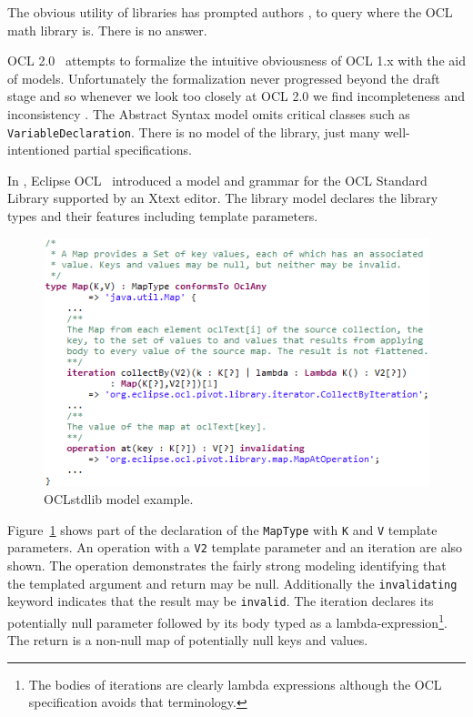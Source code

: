 \documentclass[sigconf]{acmart}
\begin{document}
The obvious utility of libraries has prompted authors \cite{Baar2011},\cite{Cabot2012} to query where the OCL math library is. There is no answer.

OCL 2.0~\cite{OCL-2.0} attempts to formalize the intuitive obviousness of OCL 1.x with the aid of models. Unfortunately the formalization never progressed beyond the draft stage and so whenever we look too closely at OCL 2.0 we find incompleteness and inconsistency \cite{Willink2020}. The Abstract Syntax model omits critical classes such as \verb|VariableDeclaration|. There is no model of the library, just many well-intentioned partial specifications.

In \cite{Willink2011}, Eclipse OCL~\cite{Eclipse-OCL} introduced a model and grammar for the OCL Standard Library supported by an Xtext editor. The library model declares the library types and their features including template parameters.

\begin{figure}
\includegraphics[width=\columnwidth]{OCLstdlib.png}
\caption{OCLstdlib model example.}
\label{fig:oclstdlib}
\end{figure}

Figure~\ref{fig:oclstdlib} shows part of the declaration of the \verb|MapType| with \verb|K| and \verb|V| template parameters. An operation with a \verb|V2| template parameter and an iteration are also shown. The operation demonstrates the fairly strong modeling identifying that the templated argument and return may be null. Additionally the \verb|invalidating| keyword indicates that the result may be \verb|invalid|. The iteration declares its potentially null parameter followed by its body typed as a lambda-expression\footnote{The bodies of iterations are clearly lambda expressions although the OCL specification avoids that terminology.}. The return is a non-null map of potentially null keys and values.
\end{document}
